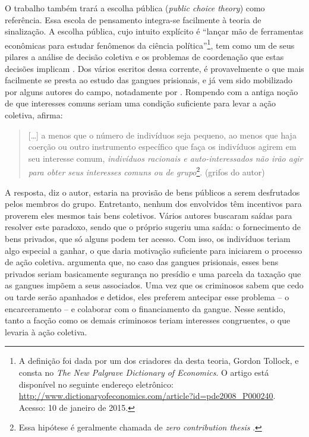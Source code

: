 \documentclass[a4paper,11pt]{article}
\begin{document}
O trabalho também trará a escolha pública (\textit{public choice theory}) como referência. Essa escola de pensamento integra-se facilmente à teoria de sinalização. A escolha pública, cujo intuito explícito é ``lançar mão de ferramentas econômicas para estudar fenômenos da ciência política''\footnote{A definição foi dada por um dos criadores da desta teoria, Gordon Tollock, e consta no \textit{The New Palgrave Dictionary of Economics}. O artigo está disponível no seguinte endereço eletrônico: \href{http://www.dictionaryofeconomics.com/article?id=pde2008_P000240}{http://www.dictionaryofeconomics.com/article?id=pde2008\_P000240}. Acesso: 10 de janeiro de 2015.}, tem como um de seus pilares a análise de decisão coletiva e os problemas de coordenação que estas decisões implicam \citep{abrams1980foundations, arrow1951social}. Dos vários escritos dessa corrente, \citet{olson1965logic} é provavelmente o que mais facilmente se presta ao estudo das gangues prisionais, e já vem sido mobilizado por alguns autores do campo, notadamente por \citet{skarbek2011governance, skarbek2014social}. Rompendo com a antiga noção de que interesses comuns seriam uma condição suficiente para levar a ação coletiva, \citet[2]{olson1965logic} afirma: 

\begin{quote}
[\dots] a menos que o número de indivíduos seja pequeno, ao menos que haja coerção ou outro instrumento específico que faça os indivíduos agirem em seu interesse comum, \textit{indivíduos racionais e auto-interessados não irão agir para obter seus interesses comuns ou de grupo}\footnote{Essa hipótese é geralmente chamada de \textit{zero contribution thesis} \citep{ostrom2000crowding}.}. (grifos do autor)
\end{quote}

A resposta, diz o autor, estaria na provisão de bens públicos a serem desfrutados pelos membros do grupo. Entretanto, nenhum dos envolvidos têm incentivos para proverem eles mesmos tais bens coletivos. Vários autores buscaram saídas para resolver este paradoxo, sendo que o próprio \citet{olson1965logic} sugeriu uma saída: o fornecimento de bens privados, que só alguns podem ter acesso. Com isso, os indivíduos teriam algo especial a ganhar, o que daria motivação suficiente para iniciarem o processo de ação coletiva. \citet{skarbek2011governance} argumenta que, no caso das gangues prisionais, esses bens privados seriam basicamente segurança no presídio e uma parcela da taxação que as gangues impõem a seus associados. Uma vez que os criminosos sabem que cedo ou tarde serão apanhados e detidos, eles preferem antecipar esse problema -- o encarceramento -- e colaborar com o financiamento da gangue. Nesse sentido, tanto a facção como os demais criminosos teriam interesses congruentes, o que levaria à ação coletiva. 
\end{document}
